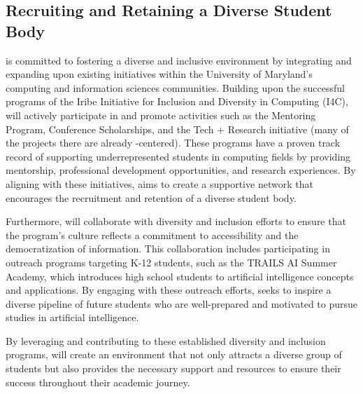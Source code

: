 \subsection{Recruiting and Retaining a Diverse Student Body}

\name{} is committed to fostering a diverse and inclusive environment by integrating and expanding upon existing initiatives within the University of Maryland's computing and information sciences communities. Building upon the successful programs of the Iribe Initiative for Inclusion and Diversity in Computing (I4C), \short{} will actively participate in and promote activities such as the Mentoring Program, Conference Scholarships, and the Tech + Research initiative (many of the projects there are already \ai{}-centered). These programs have a proven track record of supporting underrepresented students in computing fields by providing mentorship, professional development opportunities, and research experiences. By aligning with these initiatives, \short{} aims to create a supportive network that encourages the recruitment and retention of a diverse student body. 

Furthermore, \short{} will collaborate with diversity and inclusion efforts to ensure that the program's culture reflects a commitment to accessibility and the democratization of information. This collaboration includes participating in outreach programs targeting K-12 students, such as the TRAILS AI Summer Academy, which introduces high school students to artificial intelligence concepts and applications. By engaging with these outreach efforts, \short{} seeks to inspire a diverse pipeline of future students who are well-prepared and motivated to pursue studies in artificial intelligence. 

By leveraging and contributing to these established diversity and inclusion programs, \short{} will create an environment that not only attracts a diverse group of students but also provides the necessary support and resources to ensure their success throughout their academic journey.
